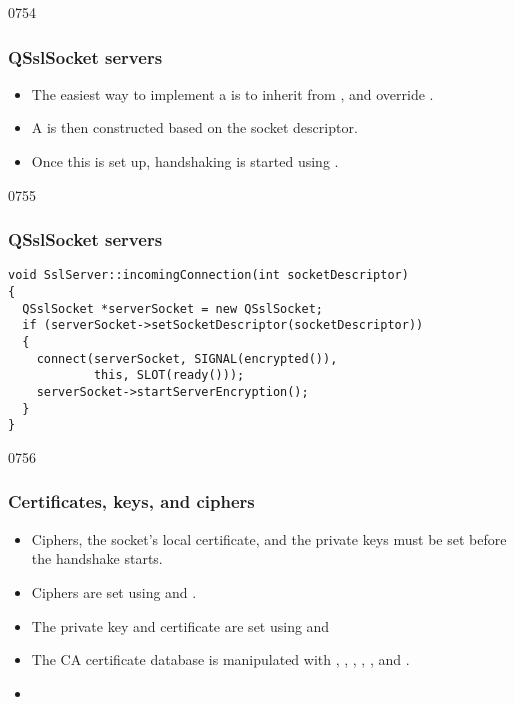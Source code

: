 \begin{slide}[fragile]{0754}
\frametitle{QSslSocket servers}
\begin{itemize}
\item The easiest way to implement a  is to inherit
  from , and override
  .
\item A  is then constructed based on the socket
  descriptor.
\item Once this is set up, handshaking is started using
  .
\end{itemize}
\end{slide}

\begin{slide}[fragile]{0755}
\frametitle{QSslSocket servers}
\begin{verbatim}
void SslServer::incomingConnection(int socketDescriptor)
{
  QSslSocket *serverSocket = new QSslSocket;
  if (serverSocket->setSocketDescriptor(socketDescriptor)) 
  {
    connect(serverSocket, SIGNAL(encrypted()), 
            this, SLOT(ready()));
    serverSocket->startServerEncryption();
  }
}
\end{verbatim}
\end{slide}

\begin{slide}{0756}
\frametitle{Certificates, keys, and ciphers}
\begin{itemize}
\item Ciphers, the socket's local certificate, and the private keys must be set
  before the handshake starts.
\item Ciphers are set using  and
  .
\item The private key and certificate are set using
   and
\item The CA certificate database is manipulated with
  ,
  ,
  ,
  ,
  , and
  .
\item {}
\end{itemize}
\end{slide}


